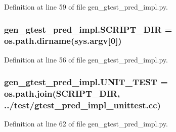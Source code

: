 Definition at line 59 of file gen\+\_\+gtest\+\_\+pred\+\_\+impl.\+py.

\subsubsection[{\texorpdfstring{S\+C\+R\+I\+P\+T\+\_\+\+D\+IR}{SCRIPT_DIR}}]{\setlength{\rightskip}{0pt plus 5cm}gen\+\_\+gtest\+\_\+pred\+\_\+impl.\+S\+C\+R\+I\+P\+T\+\_\+\+D\+IR = os.\+path.\+dirname(sys.\+argv\mbox{[}0\mbox{]})}\hypertarget{namespacegen__gtest__pred__impl_aed087c7fc787a064f0a9fd5f5f9f6487}{}\label{namespacegen__gtest__pred__impl_aed087c7fc787a064f0a9fd5f5f9f6487}


Definition at line 56 of file gen\+\_\+gtest\+\_\+pred\+\_\+impl.\+py.

\subsubsection[{\texorpdfstring{U\+N\+I\+T\+\_\+\+T\+E\+ST}{UNIT_TEST}}]{\setlength{\rightskip}{0pt plus 5cm}gen\+\_\+gtest\+\_\+pred\+\_\+impl.\+U\+N\+I\+T\+\_\+\+T\+E\+ST = os.\+path.\+join({\bf S\+C\+R\+I\+P\+T\+\_\+\+D\+IR}, \textquotesingle{}../test/{\bf gtest\+\_\+pred\+\_\+impl\+\_\+unittest.\+cc}\textquotesingle{})}\hypertarget{namespacegen__gtest__pred__impl_a8c1cb8e87c4bd84edbb958f73b7df200}{}\label{namespacegen__gtest__pred__impl_a8c1cb8e87c4bd84edbb958f73b7df200}


Definition at line 62 of file gen\+\_\+gtest\+\_\+pred\+\_\+impl.\+py.

